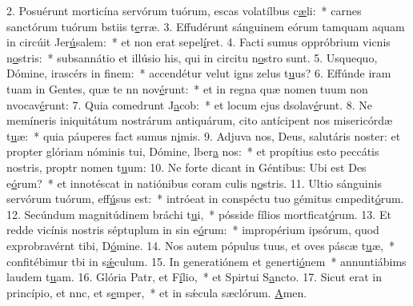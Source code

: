 2. Posuérunt morticína servórum tuórum, escas volatílbus c\uline{æ}li:~* carnes sanctórum tuórum bstiis t\uline{e}rræ.
3. Effudérunt sánguinem eórum tamquam aquam in circúit Jer\uline{ú}salem:~* et non erat  sepel\uline{í}ret.
4. Facti sumus oppróbrium vicnis n\uline{o}stris:~* subsannátio et illúsio his, qui in circitu n\uline{o}stro sunt.
5. Usquequo, Dómine, irascérs in f\uline{i}nem:~* accendétur velut igns zelus t\uline{u}us?
6. Effúnde iram tuam in Gentes, quæ te nn nov\uline{é}runt:~* et in regna quæ nomen tuum non nvocav\uline{é}runt:
7. Quia comedrunt J\uline{a}cob:~* et locum ejus dsolav\uline{é}runt.
8. Ne memíneris iniquitátum nostrárum antiquárum, cito antícipent nos misericórdæ t\uline{u}æ:~* quia páuperes fact sumus n\uline{i}mis.
9. Adjuva nos, Deus, salutáris noster: et propter glóriam nóminis tui, Dómine, lber\uline{a} nos:~* et propítius esto peccátis nostris, proptr nomen t\uline{u}um:
10. Ne forte dicant in Géntibus: Ubi est Des e\uline{ó}rum?~* et innotéscat in natiónibus coram culis n\uline{o}stris.
11. Ultio sánguinis servórum tuórum,  eff\uline{ú}sus est:~* intróeat in conspéctu tuo gémitus cmpedit\uline{ó}rum.
12. Secúndum magnitúdinem bráchi t\uline{u}i,~* pósside fílios mortficat\uline{ó}rum.
13. Et redde vicínis nostris séptuplum in sin e\uline{ó}rum:~* impropérium ipsórum, quod exprobravérnt tibi, D\uline{ó}mine.
14. Nos autem pópulus tuus, et oves páscæ t\uline{u}æ,~* confitébimur tbi in s\uline{ǽ}culum.
15. In generatiónem et generti\uline{ó}nem~* annuntiábims laudem t\uline{u}am.
16. Glória Patr, et F\uline{í}lio,~* et Spirtui S\uline{a}ncto.
17. Sicut erat in princípio, et nnc, et s\uline{e}mper,~* et in sǽcula sæclórum. \uline{A}men.
